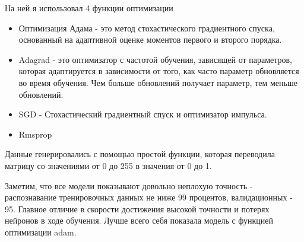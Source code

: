 \begin{figure}[H]
\end{figure}

На ней я использовал 4 функции оптимизации

\begin{itemize}
	\item Оптимизация Адама - это метод стохастического градиентного спуска, основанный на адаптивной оценке моментов первого и второго порядка.
	\item Adagrad - это оптимизатор с частотой обучения, зависящей от параметров, которая адаптируется в зависимости от того, как часто параметр обновляется во время обучения. Чем больше обновлений получает параметр, тем меньше обновлений.
	\item SGD - Стохастический градиентный спуск и оптимизатор импульса.
	\item Rmsprop
\end{itemize}

Данные генерировались с помощью простой функции, которая переводила матрицу со значениями от 0 до 255 в значения от 0 до 1.

\begin{figure}[H]
\end{figure}
Заметим, что все модели показывают довольно неплохую точность - распознавание тренировочных данных не ниже 99 процентов, валидационных - 95. Главное отличие в скорости достижения высокой точности и потерях нейронов в ходе обучения. Лучше всего себя показала модель с функцией оптимизации adam.

